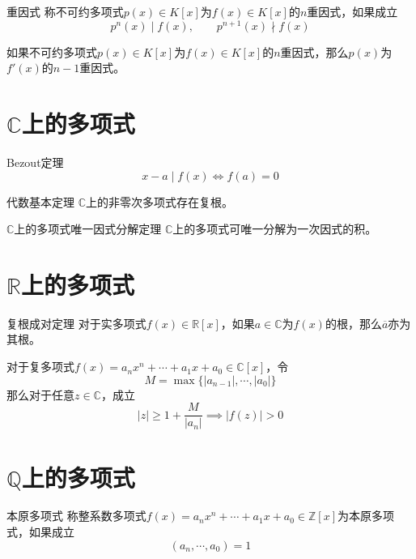 \documentclass[lang = cn, scheme = chinese, thmcnt = section]{elegantbook}
\newcommand{\R}{\mathbb{R}}            %
\newcommand{\C}{\mathbb{C}}  		   %
\newcommand{\Q}{\mathbb{Q}}            %
\newcommand{\Z}{\mathbb{Z}}            %
\begin{document}
\begin{definition}{重因式}
	称不可约多项式$p(x)\in K[x]$为$f(x)\in K[x]$的$n$重因式，如果成立
	$$
	p^n(x)\mid f(x),\qquad 
	p^{n+1}(x)\nmid f(x)
	$$
\end{definition}

\begin{theorem}
	如果不可约多项式$p(x)\in K[x]$为$f(x)\in K[x]$的$n$重因式，那么$p(x)$为$f'(x)$的$n-1$重因式。
\end{theorem}

\section{$\C$上的多项式}

\begin{theorem}{Bezout定理}
	$$
	x-a\mid f(x)\iff f(a)=0
	$$
\end{theorem}

\begin{theorem}{代数基本定理}
	$\C$上的非零次多项式存在复根。
\end{theorem}

\begin{theorem}{$\C$上的多项式唯一因式分解定理}
	$\C$上的多项式可唯一分解为一次因式的积。
\end{theorem}

\section{$\R$上的多项式}

\begin{theorem}{复根成对定理}
	对于实多项式$f(x)\in \R[x]$，如果$a\in \C$为$f(x)$的根，那么$\overline{a}$亦为其根。
\end{theorem}

\begin{theorem}
	对于复多项式$f(x)=a_nx^n+\cdots+a_1x+a_0\in\C[x]$，令
	$$
	M=\max\{ |a_{n-1}|,\cdots,|a_0| \}
	$$
	那么对于任意$z\in\C$，成立
	$$
	|z|\ge 1+\frac{M}{|a_n|}
	\implies
	|f(z)|>0
	$$
\end{theorem}

\section{$\Q$上的多项式}

\begin{definition}{本原多项式}
	称整系数多项式$f(x)=a_nx^n+\cdots+a_1x+a_0\in\Z[x]$为本原多项式，如果成立
	$$
	(a_n,\cdots,a_0)=1
	$$
\end{definition}
\end{document}
